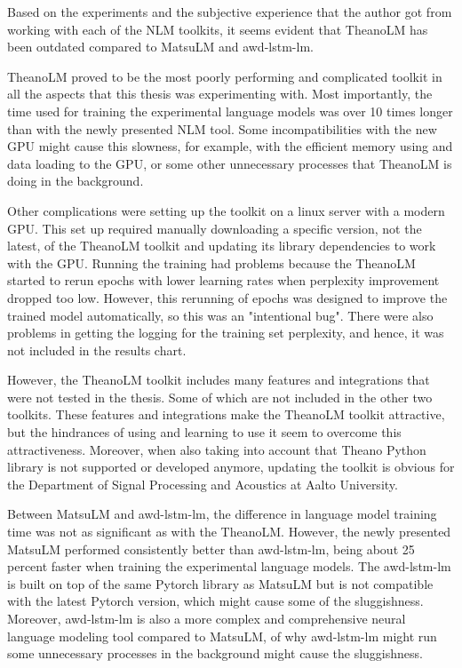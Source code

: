 Based on the experiments and the subjective experience that the author got from working with each of the NLM toolkits, it seems evident that TheanoLM has been outdated compared to MatsuLM and awd-lstm-lm.

TheanoLM proved to be the most poorly performing and complicated toolkit in all the aspects that this thesis was experimenting with. Most importantly, the time used for training the experimental language models was over 10 times longer than with the newly presented NLM tool. Some incompatibilities with the new GPU might cause this slowness, for example, with the efficient memory using and data loading to the GPU, or some other unnecessary processes that TheanoLM is doing in the background.

Other complications were setting up the toolkit on a linux server with a modern GPU. This set up required manually downloading a specific version, not the latest, of the TheanoLM toolkit and updating its library dependencies to work with the GPU. Running the training had problems because the TheanoLM started to rerun epochs with lower learning rates when perplexity improvement dropped too low. However, this rerunning of epochs was designed to improve the trained model automatically, so this was an "intentional bug". There were also problems in getting the logging for the training set perplexity, and hence, it was not included in the results chart.

However, the TheanoLM toolkit includes many features and integrations that were not tested in the thesis. Some of which are not included in the other two toolkits. These features and integrations make the TheanoLM toolkit attractive, but the hindrances of using and learning to use it seem to overcome this attractiveness. Moreover, when also taking into account that Theano Python library is not supported or developed anymore, updating the toolkit is obvious for the Department of Signal Processing and Acoustics at Aalto University.


Between MatsuLM and awd-lstm-lm, the difference in language model training time was not as significant as with the TheanoLM. However, the newly presented MatsuLM performed consistently better than awd-lstm-lm, being about 25 percent faster when training the experimental language models. The awd-lstm-lm is built on top of the same Pytorch library as MatsuLM but is not compatible with the latest Pytorch version, which might cause some of the sluggishness. Moreover, awd-lstm-lm is also a more complex and comprehensive neural language modeling tool compared to MatsuLM, of why awd-lstm-lm might run some unnecessary processes in the background might cause the sluggishness. 

